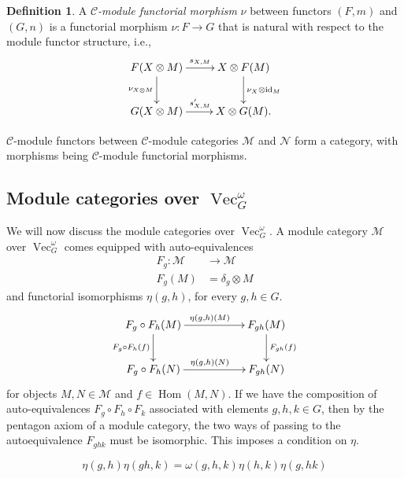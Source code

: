 \documentclass[a4paper, 10pt]{book}
\theoremstyle{definition}
\newtheorem{Def}[theorem]{Definition}
\numberwithin{equation}{chapter}
\newcommand\id{\operatorname{id}}
\newcommand\Vect{\operatorname{Vec}}
\newcommand\Hom{\operatorname{Hom}}
\newcommand\M{\mathcal{M}}
\newcommand\NN{\mathcal{N}}
\newcommand\C{\mathcal C}
\newcommand{\ra}\rightarrow
\begin{document}
\begin{Def}
A \textit{ $\C$-module functorial morphism} $\nu$ between functors $(F,m)$ and $(G, n)$ is a functorial morphism $\nu:F\rightarrow G$ that is natural with respect to the module functor structure, i.e., \[
	\xymatrix{
  	F(X\otimes M) \ar[d]_{\nu_{X\otimes M}}\ar[r]^{s_{X, M}} & X\otimes F(M)\ar[d]^{\nu_X \otimes \id_M}\\
   G(X\otimes M)	 \ar[r]^{s'_{X, M}} & X\otimes G(M).}			
\]

\end{Def}
$\C$-module functors between $\C$-module categories $\M$ and $\NN$ form a category, with morphisms being $\C$-module functorial morphisms.
\subsection{Module categories over $\Vect^\omega_G$}
We will now discuss the module categories over $\Vect^\omega_G$. A module category $\M$ over $\Vect^\omega_G$ comes equipped with auto-equivalences \begin{align}
F_g:\M &\ra \M\label{autoeq}\\F_g(M) &= \delta_g \otimes M\nonumber
\end{align} and functorial isomorphisms $\eta(g, h)$, for every $g,h \in G$. \begin{equation*}
	\xymatrix{F_g\circ F_h (M) \ar[rr]^{\eta(g, h)(M)}\ar[d]_{F_g\circ F_h(f)} && F_{gh}(M) \ar[d]^{F_{gh}(f)} \\
	F_g\circ F_h(N) \ar[rr]^{\eta(g,h)(N)} && F_{gh}(N)} 
\end{equation*}  for objects $M, N \in \M$ and $f\in \Hom(M, N)$. If we have the composition of auto-equivalences $F_g\circ F_h\circ F_k$ associated with elements $g,h, k \in G$, then by the pentagon axiom of a module category, the two ways of passing to the autoequivalence $F_{ghk}$ must be isomorphic. This imposes a  condition on $\eta$.

\begin{equation*}
	\eta(g, h)\eta(gh,k) = \omega(g, h, k)\eta(h,k)\eta(g, hk)
\end{equation*}
\end{document}

